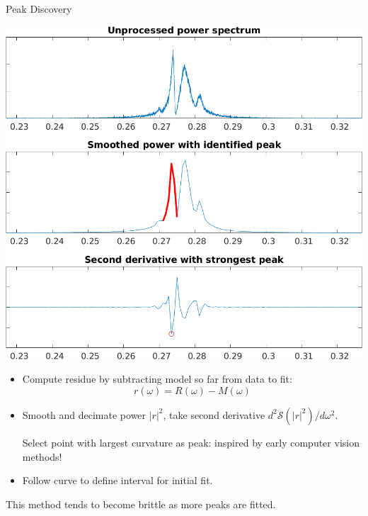 \documentclass[aspectratio=169, xcolor=table]{beamer}
\begin{document}
%
\begin{frame}{Peak Discovery}

\begin{minipage}{0.4\textwidth}
\includegraphics[width=\linewidth]{discover-peak.png}
\end{minipage}%
\quad
\begin{minipage}{0.55\textwidth}
\begin{itemize}
\item Compute residue by subtracting model so far from data to fit:
    \[
        r(\omega) = R(\omega) - M(\omega)
    \]
\item Smooth and decimate power $|r|^2$, take second derivative
    $d^2\mathcal{S}(|r|^2)/d\omega^2$.

\medskip

    Select point with
    largest curvature as peak: inspired by early computer vision methods!
\item Follow curve to define interval for initial fit.
\end{itemize}

This method tends to become brittle as more peaks are fitted.
\end{minipage}

\end{frame}
\end{document}

